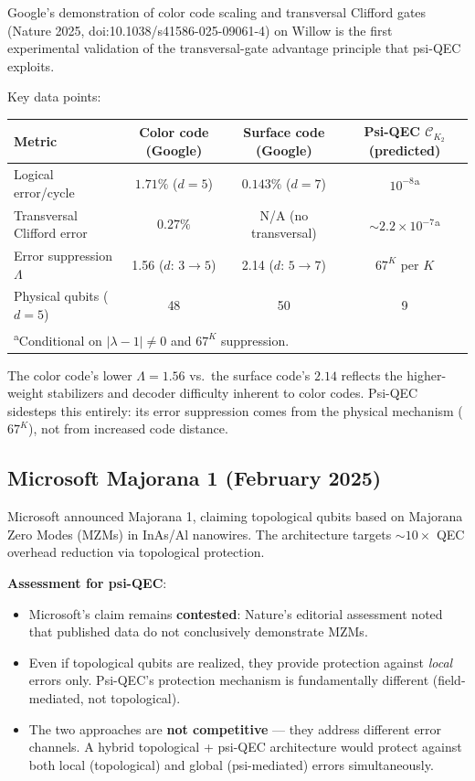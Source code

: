 \documentclass[11pt]{article}
\theoremstyle{definition}
\theoremstyle{remark}
\newcommand{\CK}{\mathcal{C}_K}
\newcommand{\lamdiff}{|\lambda-1|}
\begin{document}
Google's demonstration of color code scaling and transversal Clifford gates
(Nature 2025, doi:10.1038/s41586-025-09061-4) on Willow is the first
experimental validation of the transversal-gate advantage principle that
psi-QEC exploits.

Key data points:
\begin{center}
\begin{tabular}{@{}lccc@{}}
\toprule
Metric & Color code (Google) & Surface code (Google) & Psi-QEC $\CK_2$ (predicted) \\
\midrule
Logical error/cycle & $1.71\%$ ($d=5$) & $0.143\%$ ($d=7$) & $10^{-8}$\textsuperscript{a} \\
Transversal Clifford error & $0.27\%$ & N/A (no transversal) & $\sim 2.2 \times 10^{-7}$\textsuperscript{a} \\
Error suppression $\Lambda$ & 1.56 ($d$: $3 \to 5$) & 2.14 ($d$: $5 \to 7$) & $67^K$ per $K$ \\
Physical qubits ($d=5$) & 48 & 50 & 9 \\
\bottomrule
\multicolumn{4}{l}{\textsuperscript{a}Conditional on $\lamdiff \neq 0$ and $67^K$ suppression.}
\end{tabular}
\end{center}

The color code's lower $\Lambda = 1.56$ vs.\ the surface code's $2.14$
reflects the higher-weight stabilizers and decoder difficulty inherent
to color codes.  Psi-QEC sidesteps this entirely: its error suppression
comes from the physical mechanism ($67^K$), not from increased code
distance.

\subsection{Microsoft Majorana 1 (February 2025)}
\label{sec:majorana}

Microsoft announced Majorana 1, claiming topological qubits based on
Majorana Zero Modes (MZMs) in InAs/Al nanowires.  The architecture
targets $\sim 10\times$ QEC overhead reduction via topological protection.

\textbf{Assessment for psi-QEC}:
\begin{itemize}[nosep]
  \item Microsoft's claim remains \textbf{contested}: Nature's editorial
    assessment noted that published data do not conclusively demonstrate MZMs.
  \item Even if topological qubits are realized, they provide protection
    against \emph{local} errors only.  Psi-QEC's protection mechanism is
    fundamentally different (field-mediated, not topological).
  \item The two approaches are \textbf{not competitive} --- they address
    different error channels.  A hybrid topological + psi-QEC architecture
    would protect against both local (topological) and global (psi-mediated)
    errors simultaneously.
\end{itemize}
\end{document}
